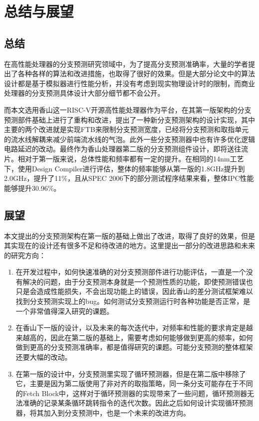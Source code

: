 
\chapter{总结与展望}

\section{总结}

在高性能处理器的分支预测研究领域中，为了提高分支预测准确率，大量的学者提出了各种各样的算法和改进措施，也取得了很好的效果。但是大部分论文中的算法设计都是基于模拟器进行性能分析，并没有考虑到现实物理设计时的限制，而商业处理器的分支预测具体设计大部分细节都不会公开。

而本文选用香山这一RISC-V开源高性能处理器作为平台，在其第一版架构的分支预测部件基础上进行了重构和改进，提出了一种新分支预测架构的设计实现，其中主要的两个改进就是实现FTB来限制分支预测宽度，已经将分支预测和取指单元的流水线解耦来减少前端流水线的气泡。此外一些分支预测器中也有许多优化逻辑电路延迟的改动。最终作为香山处理器第二版的分支预测组件设计，即将送往流片。相对于第一版来说，总体性能和频率都有一定的提升。在相同的14nm工艺下，使用Design Compiler进行评估，整体的频率能够从第一版的1.8GHz提升到2.0GHz，提升了11\%，且从SPEC 2006下的部分测试程序结果来看，整体IPC性能能够提升30.96\%。

\section{展望}

本文提出的分支预测架构在第一版的基础上做出了改进，取得了良好的效果，但是其实现在的设计还有很多不足和待改进的地方。这里提出一部分的改进思路和未来的研究方向：

\begin{enumerate}
    \item 在开发过程中，如何快速准确的对分支预测部件进行功能评估，一直是一个没有解决的问题，由于分支预测本身就是一个预测性质的功能，即使预测错误也只是会造成性能损失，不会出现功能上的错误，因此香山的差分测试框架难以找到分支预测实现上的bug。如何测试分支预测运行时各种功能是否正常，是一个非常值得深入研究的课题。
    \item 在香山下一版的设计，以及未来的每次迭代中，对频率和性能的要求肯定是越来越高的，因此在第二版的基础上，需要考虑如何能够做到更高的频率，如何做到更高的分支预测准确率，都是值得研究的课题。可能分支预测的整体框架还要大幅的改动。
    \item 在第一版的设计中，分支预测里实现了循环预测器，但是在第二版中移除了它，主要是因为第二版使用了非对齐的取指策略，同一条分支可能存在于不同的Fetch Block中，这样对于循环预测器的实现带来了一些问题，循环预测器无法准确的记录某条循环跳转指令的迭代次数。因此之后如何设计实现循环预测器，将其加入到分支预测中，也是一个未来的改进方向。
\end{enumerate}

